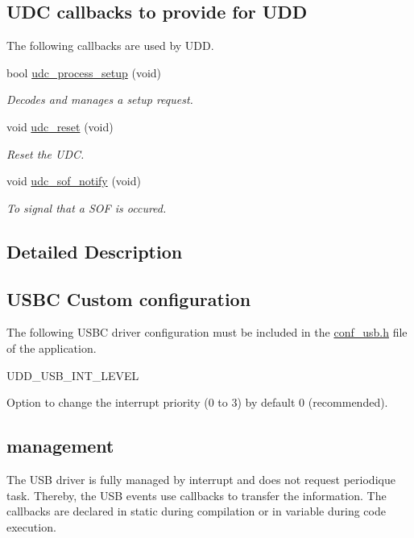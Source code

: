 \subsection*{\-U\-D\-C callbacks to provide for \-U\-D\-D}
\label{_amgrpac0b98f9d000f73c8d3a8c3cb0ebf40a}%
 \-The following callbacks are used by \-U\-D\-D. \begin{DoxyCompactItemize}
\item 
bool \hyperlink{group__udd__group_ga58c2916d7984e0e5b2143cadf4af6080}{udc\-\_\-process\-\_\-setup} (void)
\begin{DoxyCompactList}\small\item\em \-Decodes and manages a setup request. \end{DoxyCompactList}\item 
void \hyperlink{group__udd__group_ga11a32ff7928ba06d3b59e95e0a2b7a92}{udc\-\_\-reset} (void)
\begin{DoxyCompactList}\small\item\em \-Reset the \-U\-D\-C. \end{DoxyCompactList}\item 
void \hyperlink{group__udd__group_ga4afae313045f44b5eb4c60957ab8ef4e}{udc\-\_\-sof\-\_\-notify} (void)
\begin{DoxyCompactList}\small\item\em \-To signal that a \-S\-O\-F is occured. \end{DoxyCompactList}\end{DoxyCompactItemize}


\subsection{\-Detailed \-Description}
\hypertarget{group__udd__group_USBC_CONF}{}\subsection{\-U\-S\-B\-C Custom configuration}\label{group__udd__group_USBC_CONF}
\-The following \-U\-S\-B\-C driver configuration must be included in the \hyperlink{conf__usb_8h}{conf\-\_\-usb.\-h} file of the application.

\-U\-D\-D\-\_\-\-U\-S\-B\-\_\-\-I\-N\-T\-\_\-\-L\-E\-V\-E\-L\par
 \-Option to change the interrupt priority (0 to 3) by default 0 (recommended).\hypertarget{group__udd__group_Callbacks}{}\subsection{management}\label{group__udd__group_Callbacks}
\-The \-U\-S\-B driver is fully managed by interrupt and does not request periodique task. \-Thereby, the \-U\-S\-B events use callbacks to transfer the information. \-The callbacks are declared in static during compilation or in variable during code execution.

